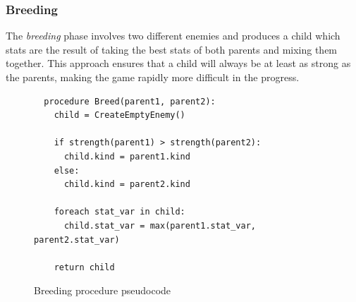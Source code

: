 \documentclass[11pt]{article}
\begin{document}
\pagebreak

\subsubsection{Breeding}
The \textit{breeding} phase involves two different enemies and produces a child which stats are the result of taking the best stats of both parents and mixing them together.
This approach ensures that a child will always be at least as strong as the parents, making the game rapidly more difficult in the progress.

\begin{figure}[H]
  \begin{lstlisting}
  procedure Breed(parent1, parent2):
    child = CreateEmptyEnemy()

    if strength(parent1) > strength(parent2):
      child.kind = parent1.kind
    else:
      child.kind = parent2.kind

    foreach stat_var in child:
      child.stat_var = max(parent1.stat_var, parent2.stat_var)

    return child 
  \end{lstlisting}
  \caption{Breeding procedure pseudocode}
\end{figure}
\end{document}
